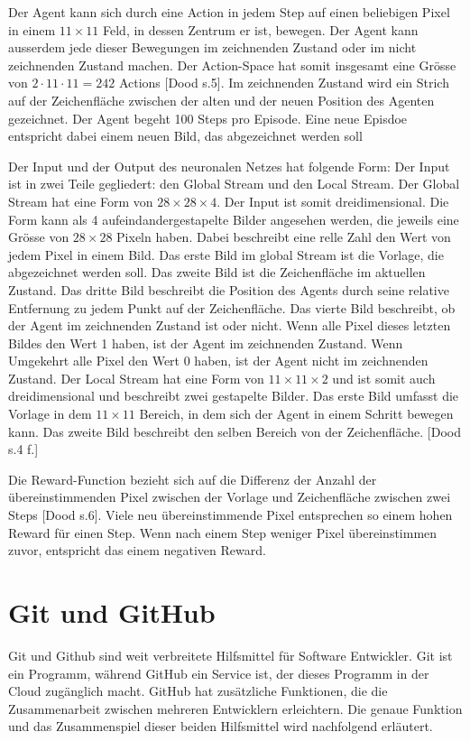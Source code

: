 Der Agent kann sich durch eine Action in jedem Step auf einen beliebigen Pixel
in einem $11\times11$ Feld, in dessen Zentrum er ist, bewegen. Der Agent kann
ausserdem jede dieser Bewegungen im zeichnenden Zustand oder im nicht
zeichnenden Zustand machen. Der Action-Space hat somit insgesamt eine Grösse von
$2\cdot11\cdot11 = 242$ Actions [Dood s.5]. Im zeichnenden Zustand wird ein Strich auf der
Zeichenfläche zwischen der alten und der neuen Position des Agenten gezeichnet.
Der Agent begeht 100 Steps pro Episode. Eine neue Episdoe entspricht dabei einem
neuen Bild, das abgezeichnet werden soll

Der Input und der Output des neuronalen Netzes hat folgende Form: Der Input ist
in zwei Teile gegliedert: den Global Stream und den Local Stream. 
Der Global Stream hat eine Form von $28\times28\times4$. Der Input ist somit
dreidimensional. Die Form kann als 4 aufeindandergestapelte Bilder angesehen
werden, die jeweils eine Grösse von $28\times28$ Pixeln haben. Dabei beschreibt
eine relle Zahl den Wert von jedem Pixel in einem Bild. Das erste Bild im global
Stream ist die Vorlage, die abgezeichnet werden soll. Das zweite Bild ist die
Zeichenfläche im aktuellen Zustand. Das dritte Bild beschreibt die Position des
Agents durch seine relative Entfernung zu jedem Punkt auf der Zeichenfläche. Das
vierte Bild beschreibt, ob der Agent im zeichnenden Zustand ist oder nicht. Wenn
alle Pixel dieses letzten Bildes den Wert 1 haben, ist der Agent im zeichnenden
Zustand. Wenn Umgekehrt alle Pixel den Wert 0 haben, ist der Agent nicht im
zeichnenden Zustand. 
Der Local Stream hat eine Form von $11\times11\times2$ und ist somit auch
dreidimensional und beschreibt zwei gestapelte Bilder. Das erste Bild umfasst
die Vorlage in dem $11\times11$ Bereich, in dem sich der Agent in einem Schritt
bewegen kann. Das zweite Bild beschreibt den selben Bereich von der Zeichenfläche. [Dood s.4 f.]

Die Reward-Function bezieht sich auf die Differenz der Anzahl der
übereinstimmenden Pixel zwischen der Vorlage und Zeichenfläche zwischen zwei
Steps [Dood s.6]. Viele neu übereinstimmende Pixel entsprechen so einem hohen Reward für
einen Step. Wenn nach einem Step weniger Pixel übereinstimmen zuvor, entspricht
das einem negativen Reward. 

\section{Git und GitHub}
\label{chap:git_github}
Git und Github sind weit verbreitete Hilfsmittel für Software Entwickler. Git
ist ein Programm, während GitHub ein Service ist, der dieses Programm in der
Cloud zugänglich macht. GitHub hat zusätzliche Funktionen, die die Zusammenarbeit
zwischen mehreren Entwicklern erleichtern. Die genaue Funktion und das
Zusammenspiel dieser beiden Hilfsmittel wird nachfolgend erläutert.

